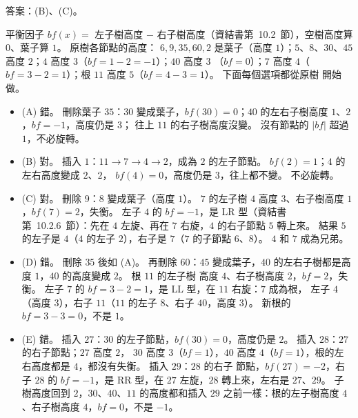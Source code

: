 \begin{pastsoln}
答案：(B)、(C)。

平衡因子 $\mathit{bf}(x) = $ 左子樹高度 $-$ 右子樹高度（資結書第~10.2~節），空樹高度算 $0$、葉子算 $1$。 原樹各節點的高度：
$6, 9, 35, 60, 2$ 是葉子（高度 $1$）；$5$、$8$、$30$、$45$ 高度 $2$；$4$ 高度 $3$（$\mathit{bf} = 1 - 2 = -1$）；$40$ 高度 $3$
（$\mathit{bf} = 0$）；$7$ 高度 $4$（$\mathit{bf} = 3 - 2 = 1$）；根 $11$ 高度 $5$（$\mathit{bf} = 4 - 3 = 1$）。 下面每個選項都從原樹
開始做。

\begin{itemize}
\item (A) 錯。 刪除葉子 $35$：$30$ 變成葉子，$\mathit{bf}(30) = 0$；$40$ 的左右子樹高度 $1$、$2$，$\mathit{bf} = -1$，高度仍是 $3$；
往上 $11$ 的右子樹高度沒變。 沒有節點的 $|\mathit{bf}|$ 超過 $1$，不必旋轉。
\item (B) 對。 插入 $1$：$11 \to 7 \to 4 \to 2$，成為 $2$ 的左子節點。 $\mathit{bf}(2) = 1$；$4$ 的左右高度變成 $2$、$2$，
$\mathit{bf}(4) = 0$，高度仍是 $3$，往上都不變。 不必旋轉。
\item (C) 對。 刪除 $9$：$8$ 變成葉子（高度 $1$）。 $7$ 的左子樹 $4$ 高度 $3$、右子樹高度 $1$，$\mathit{bf}(7) = 2$，失衡。
左子 $4$ 的 $\mathit{bf} = -1$，是 LR 型（資結書第~10.2.6~節）：先在 $4$ 左旋、再在 $7$ 右旋，$4$ 的右子節點 $5$ 轉上來。 結果
$5$ 的左子是 $4$（$4$ 的左子 $2$），右子是 $7$（$7$ 的子節點 $6$、$8$）。 $4$ 和 $7$ 成為兄弟。
\item (D) 錯。 刪除 $35$ 後如 (A)。 再刪除 $60$：$45$ 變成葉子，$40$ 的左右子樹都是高度 $1$，$40$ 的高度變成 $2$。 根 $11$ 的左子樹
高度 $4$、右子樹高度 $2$，$\mathit{bf} = 2$，失衡。 左子 $7$ 的 $\mathit{bf} = 3 - 2 = 1$，是 LL 型，在 $11$ 右旋：$7$ 成為根，
左子 $4$（高度 $3$），右子 $11$（$11$ 的左子 $8$、右子 $40$，高度 $3$）。 新根的 $\mathit{bf} = 3 - 3 = 0$，不是 $1$。
\item (E) 錯。 插入 $27$：$30$ 的左子節點，$\mathit{bf}(30) = 0$，高度仍是 $2$。 插入 $28$：$27$ 的右子節點；$27$ 高度 $2$，
$30$ 高度 $3$（$\mathit{bf} = 1$），$40$ 高度 $4$（$\mathit{bf} = 1$），根的左右高度都是 $4$，都沒有失衡。 插入 $29$：$28$ 的右子
節點，$\mathit{bf}(27) = -2$，右子 $28$ 的 $\mathit{bf} = -1$，是 RR 型，在 $27$ 左旋，$28$ 轉上來，左右是 $27$、$29$。 子樹高度回到
$2$，$30$、$40$、$11$ 的高度都和插入 $29$ 之前一樣：根的左子樹高度 $4$、右子樹高度 $4$，$\mathit{bf} = 0$，不是 $-1$。
\end{itemize}
\end{pastsoln}
